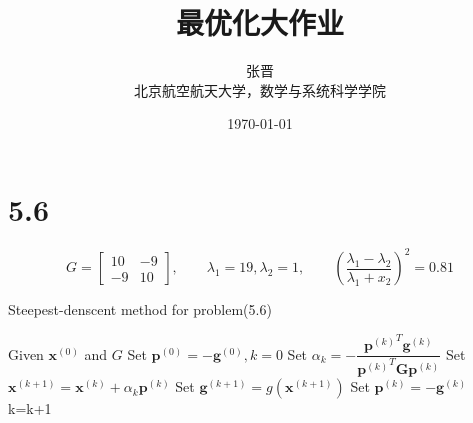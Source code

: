 

\title{\heiti 最优化大作业}
\author{\kaishu 张晋\\
				\kaishu 北京航空航天大学，数学与系统科学学院}
\date{\today}


\maketitle
\tableofcontents

\newpage
\section{5.6}
\[G=\begin{bmatrix}
10&-9\\
-9&10
\end{bmatrix},\qquad \lambda_1=19,\lambda_2=1,\qquad (\dfrac {\lambda_{1}-\lambda_{2}}{\lambda_{1}+x_{2}})^2 =0.81\]

\begin{algorithm}[h]  
\caption{Steepest-denscent method for problem(5.6)}  
\begin{algorithmic}[1]  
\STATE Given $\bm{x}^{(0)}$ and $G$
\STATE Set $\bm{p}^{(0)}=-\bm{g}^{(0)},k=0$
\STATE Set $\alpha_k=-\dfrac{{{\bm{p}^{(k)}}^T}\bm{g}^{(k)}}{{\bm{p}^{(k)}}^T\bm{G}\bm{p}^{(k)}}$
\STATE Set $\bm{x}^{(k+1)}=\bm{x}^{(k)}+\alpha_k\bm{p}^{(k)}$
\STATE Set $\bm{g}^{(k+1)}=g(\bm{x}^{(k+1)})$
\STATE Set $\bm{p}^{(k)}=-\bm{g}^{(k)}$
\STATE k=k+1
\ENDWHILE
\end{algorithmic}  
\end{algorithm}  

